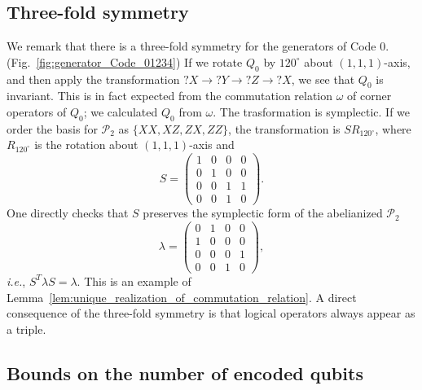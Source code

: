 \documentclass[letterpaper,10pt,pra,aps,showpacs,twocolumn]{revtex4-1}
\theoremstyle{definition} \newtheorem{defn}{Definition}
\theoremstyle{definition} \newtheorem{remark}{Remark}
\newcommand{\ie}{\emph{i.e.}}
\begin{document}
\subsection{Three-fold symmetry}
We remark that there is a three-fold symmetry for the generators of Code 0. (Fig.~\ref{fig:generator_Code_01234}) If we rotate $Q_0$ by $120^\circ$ about $(1,1,1)$-axis, and then apply the transformation $?X \to ?Y \to ?Z \to ?X$, we see that $Q_0$ is invariant. This is in fact expected from the commutation relation $\omega$ of corner operators of $Q_0$; we calculated $Q_0$ from $\omega$. The trasformation is symplectic. If we order the basis for $\mathcal{P}_2$ as $\{ XX,XZ,ZX,ZZ \}$, the transformation is $S R_{120^\circ} $, where $R_{120^\circ}$ is the rotation about $(1,1,1)$-axis and
\[
S=
 \begin{pmatrix}
  1 & 0 & 0 & 0 \\ 
  0 & 1 & 0 & 0 \\
  0 & 0 & 1 & 1 \\
  0 & 0 & 1 & 0
 \end{pmatrix}.
\]
One directly checks that $S$ preserves the symplectic form of the abelianized $\mathcal{P}_2$
\[
\lambda=
 \begin{pmatrix}
  0 & 1 & 0 & 0 \\ 
  1 & 0 & 0 & 0 \\
  0 & 0 & 0 & 1 \\
  0 & 0 & 1 & 0
 \end{pmatrix},
\]
\ie, $S^T \lambda S = \lambda$. This is an example of Lemma~\ref{lem:unique_realization_of_commutation_relation}. A direct consequence of the three-fold symmetry is that logical operators always appear as a triple.

\subsection{Bounds on the number of encoded qubits}
\end{document}
